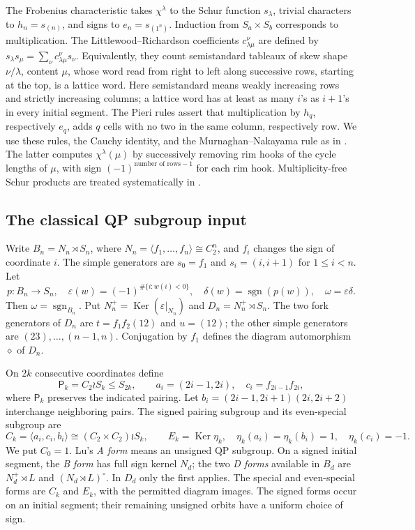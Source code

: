 \documentclass[11pt]{article}
\numberwithin{equation}{section}
\theoremstyle{definition}
\DeclareMathOperator{\sgn}{sgn}
\DeclareMathOperator{\Ker}{Ker}
\newcommand{\ee}{\varepsilon}
\newcommand{\dd}{\delta}
\newcommand{\om}{\omega}
\newcommand{\pair}{\mathsf P}
\newcommand{\diagauto}{\diamond}
\begin{document}
The Frobenius characteristic takes \(\chi^\lambda\) to the Schur function \(s_\lambda\), trivial characters to \(h_n=s_{(n)}\), and signs to \(e_n=s_{(1^n)}\).
Induction from \(S_a\times S_b\) corresponds to multiplication.
The Littlewood--Richardson coefficients \(c^\nu_{\lambda\mu}\) are defined by
\(s_\lambda s_\mu=\sum_\nu c^\nu_{\lambda\mu}s_\nu\).
Equivalently, they count semistandard tableaux of skew shape \(\nu/\lambda\), content \(\mu\), whose word read from right to left along successive rows, starting at the top, is a lattice word.
Here semistandard means weakly increasing rows and strictly increasing columns; a lattice word has at least as many \(i\)'s as \(i+1\)'s in every initial segment.
The Pieri rules assert that multiplication by \(h_q\), respectively \(e_q\), adds \(q\) cells with no two in the same column, respectively row.
We use these rules, the Cauchy identity, and the Murnaghan--Nakayama rule as in \cite{MacdonaldBook}.
The latter computes \(\chi^\lambda(\mu)\) by successively removing rim hooks of the cycle lengths of \(\mu\), with sign \((-1)^{\text{number of rows}-1}\) for each rim hook.
Multiplicity-free Schur products are treated systematically in \cite{StembridgeSchur}.

\subsection{The classical QP subgroup input}
\label{subsec:Lu}

Write \(B_n=N_n\rtimes S_n\), where \(N_n=\langle f_1,\ldots,f_n\rangle\cong C_2^n\), and \(f_i\) changes the sign of coordinate \(i\).
The simple generators are \(s_0=f_1\) and \(s_i=(i,i+1)\) for \(1\leq i<n\).
Let
\[
 p:B_n\to S_n,\quad
 \ee(w)=(-1)^{\#\{i:w(i)<0\}},\quad
 \dd(w)=\sgn(p(w)),\quad \om=\ee\dd .
\]
Then \(\om=\sgn_{B_n}\).
Put \(N_n^+=\Ker(\ee|_{N_n})\) and \(D_n=N_n^+\rtimes S_n\).
The two fork generators of \(D_n\) are \(t=f_1f_2(12)\) and \(u=(12)\); the other simple generators are \((23),\ldots,(n-1,n)\).
Conjugation by \(f_1\) defines the diagram automorphism \(\diagauto\) of \(D_n\).

On \(2k\) consecutive coordinates define
\[
 \pair_k=C_2\wr S_k\leq S_{2k},\qquad
 a_i=(2i-1,2i),\quad c_i=f_{2i-1}f_{2i},
\]
where \(\pair_k\) preserves the indicated pairing.
Let \(b_i=(2i-1,2i+1)(2i,2i+2)\) interchange neighboring pairs.
The signed pairing subgroup and its even-special subgroup are
\begin{equation}
 C_k=\langle a_i,c_i,b_i\rangle\cong(C_2\times C_2)\wr S_k,\qquad
 E_k=\Ker\eta_k,\quad
 \eta_k(a_i)=\eta_k(b_i)=1,\quad\eta_k(c_i)=-1 .
 \label{eq:CE}
\end{equation}
We put \(C_0=1\).
Lu's \emph{A form} means an unsigned QP subgroup.
On a signed initial segment, the \emph{B form} has full sign kernel \(N_d\);
the two \emph{D forms} available in \(B_d\) are
\(N_d^+\rtimes L\) and \((N_d\rtimes L)^\circ\).
In \(D_d\) only the first applies.
The special and even-special forms are \(C_k\) and \(E_k\), with the permitted diagram images.
The signed forms occur on an initial segment; their remaining unsigned orbits have a uniform choice of sign.
\end{document}
